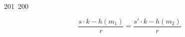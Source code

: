 201~200~\documentclass{article}
\begin{document}
	                                                                        	                                                                    	                                	                    	                    	                        	                        	                    	                                                                	                	                                                                    	                    							                                                                                                                                                                                                    		                                                                                                                        			\[
	                                                                        	                                                                    	                                	                    	                    	                        	                        	                    	                                                                	                	                                                                    	                    							                                                                                                                                                                                                    		                                                                                                                        				    \frac{s \cdot k - h(m_1)}{r} = \frac{s' \cdot k - h(m_2)}{r}
	                                                                        	                                                                    	                                	                    	                    	                        	                        	                    	                                                                	                	                                                                    	                    							                                                                                                                                                                                                    		                                                                                                                        				    \]
\end{document}
